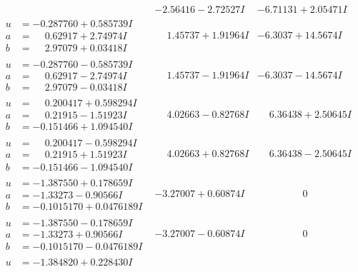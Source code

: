 \documentclass[1p]{elsarticle_modified}
\theoremstyle{definition}
\begin{document}
$$\begin{array}{c|c|c}
 & -2.56416 - 2.72527 I & -6.71131 + 2.05471 I \\ \hline\begin{aligned}
u &= -0.287760 + 0.585739 I \\
a &= \phantom{-}0.62917 + 2.74974 I \\
b &= \phantom{-}2.97079 + 0.03418 I\end{aligned}
 & \phantom{-}1.45737 + 1.91964 I & -6.3037 + 14.5674 I \\ \hline\begin{aligned}
u &= -0.287760 - 0.585739 I \\
a &= \phantom{-}0.62917 - 2.74974 I \\
b &= \phantom{-}2.97079 - 0.03418 I\end{aligned}
 & \phantom{-}1.45737 - 1.91964 I & -6.3037 - 14.5674 I \\ \hline\begin{aligned}
u &= \phantom{-}0.200417 + 0.598294 I \\
a &= \phantom{-}0.21915 - 1.51923 I \\
b &= -0.151466 + 1.094540 I\end{aligned}
 & \phantom{-}4.02663 - 0.82768 I & \phantom{-}6.36438 + 2.50645 I \\ \hline\begin{aligned}
u &= \phantom{-}0.200417 - 0.598294 I \\
a &= \phantom{-}0.21915 + 1.51923 I \\
b &= -0.151466 - 1.094540 I\end{aligned}
 & \phantom{-}4.02663 + 0.82768 I & \phantom{-}6.36438 - 2.50645 I \\ \hline\begin{aligned}
u &= -1.387550 + 0.178659 I \\
a &= -1.33273 - 0.90566 I \\
b &= -0.1015170 + 0.0476189 I\end{aligned}
 & -3.27007 + 0.60874 I & \phantom{-0.000000 } 0 \\ \hline\begin{aligned}
u &= -1.387550 - 0.178659 I \\
a &= -1.33273 + 0.90566 I \\
b &= -0.1015170 - 0.0476189 I\end{aligned}
 & -3.27007 - 0.60874 I & \phantom{-0.000000 } 0 \\ \hline\begin{aligned}
u &= -1.384820 + 0.228430 I \\

\end{aligned}
\end{array}$$
\end{document}
